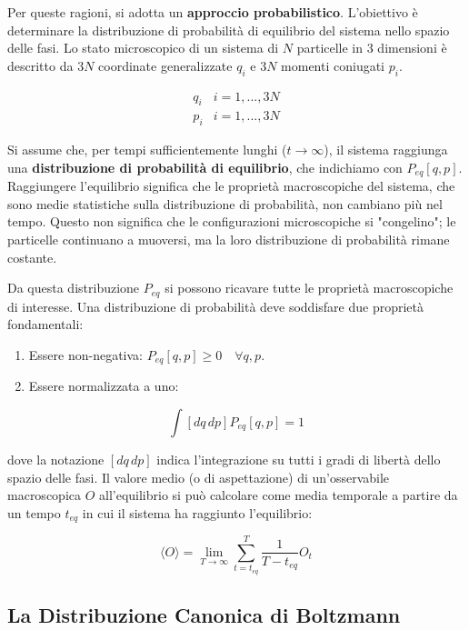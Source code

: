 Per queste ragioni, si adotta un \textbf{approccio probabilistico}. L'obiettivo è determinare la distribuzione di probabilità di equilibrio del sistema nello spazio delle fasi. Lo stato microscopico di un sistema di $N$ particelle in 3 dimensioni è descritto da $3N$ coordinate generalizzate $q_i$ e $3N$ momenti coniugati $p_i$.

\begin{equation}
    \begin{matrix}
        q_i & i=1, ..., 3N \\
        p_i & i=1, ..., 3N
    \end{matrix}
\end{equation}

Si assume che, per tempi sufficientemente lunghi ($t \to \infty$), il sistema raggiunga una \textbf{distribuzione di probabilità di equilibrio}, che indichiamo con $P_{eq}[q,p]$. Raggiungere l'equilibrio significa che le proprietà macroscopiche del sistema, che sono medie statistiche sulla distribuzione di probabilità, non cambiano più nel tempo. Questo non significa che le configurazioni microscopiche si "congelino"; le particelle continuano a muoversi, ma la loro distribuzione di probabilità rimane costante.

Da questa distribuzione $P_{eq}$ si possono ricavare tutte le proprietà macroscopiche di interesse. Una distribuzione di probabilità deve soddisfare due proprietà fondamentali:
\begin{enumerate}
    \item Essere non-negativa: $P_{eq}[q,p] \ge 0 \quad \forall q,p$.
    \item Essere normalizzata a uno:
\end{enumerate}

\begin{equation}
    \int [dq \, dp] P_{eq}[q,p] = 1
\end{equation}


dove la notazione $[dq \, dp]$ indica l'integrazione su tutti i gradi di libertà dello spazio delle fasi.
Il valore medio (o di aspettazione) di un'osservabile macroscopica $O$ all'equilibrio si può calcolare come media temporale a partire da un tempo $t_{eq}$ in cui il sistema ha raggiunto l'equilibrio:

\begin{equation}
    \langle O \rangle = \lim_{T \to \infty} \sum_{t=t_{eq}}^{T} \frac{1}{T-t_{eq}} O_t
\end{equation}


\subsection{La Distribuzione Canonica di Boltzmann}

